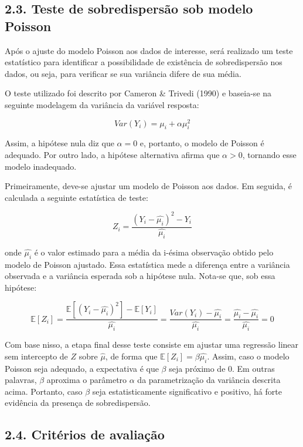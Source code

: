 \documentclass[
]{article}
\begin{document}
\subsection{2.3. Teste de sobredispersão sob modelo
Poisson}\label{teste-de-sobredispersuxe3o-sob-modelo-poisson}

Após o ajuste do modelo Poisson aos dados de interesse, será realizado
um teste estatístico para identificar a possibilidade de existência de
sobredispersão nos dados, ou seja, para verificar se sua variância
difere de sua média.

O teste utilizado foi descrito por Cameron \& Trivedi (1990) e baseia-se
na seguinte modelagem da variância da variável resposta:

\[
Var(Y_i) = \mu_i + \alpha \mu_i^2
\]

Assim, a hipótese nula diz que \(\alpha = 0\) e, portanto, o modelo de
Poisson é adequado. Por outro lado, a hipótese alternativa afirma que
\(\alpha > 0\), tornando esse modelo inadequado.

Primeiramente, deve-se ajustar um modelo de Poisson aos dados. Em
seguida, é calculada a seguinte estatística de teste:

\[
Z_i = \dfrac{(Y_i - \hat{\mu_i})^2 - Y_i}{\hat{\mu_i}}
\]

onde \(\hat{\mu_i}\) é o valor estimado para a média da i-ésima
observação obtido pelo modelo de Poisson ajustado. Essa estatística mede
a diferença entre a variância observada e a variância esperada sob a
hipótese nula. Nota-se que, sob essa hipótese:

\[
\mathbb{E}[Z_i] = \dfrac{\mathbb{E}[(Y_i - \hat{\mu_i})^2] - \mathbb{E}[Y_i]}{\hat{\mu_i}} = \dfrac{Var(Y_i) - \hat{\mu_i}}{\hat{\mu_i}} = \dfrac{\hat{\mu_i} - \hat{\mu_i}}{\hat{\mu_i}} = 0
\]

Com base nisso, a etapa final desse teste consiste em ajustar uma
regressão linear sem intercepto de \(Z\) sobre \(\hat{\mu}\), de forma
que \(\mathbb{E}[Z_i] = \beta \hat{\mu_i}\). Assim, caso o modelo
Poisson seja adequado, a expectativa é que \(\beta\) seja próximo de
\(0\). Em outras palavras, \(\beta\) aproxima o parâmetro \(\alpha\) da
parametrização da variância descrita acima. Portanto, caso \(\beta\)
seja estatisticamente significativo e positivo, há forte evidência da
presença de sobredispersão.

\subsection{2.4. Critérios de
avaliação}\label{crituxe9rios-de-avaliauxe7uxe3o}
\end{document}

